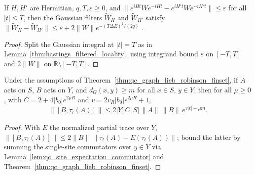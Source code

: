 \begin{lemma}
    \label{thm:hastings_truncated_filter_comparison}
    \leanok
    If $H,H'$ are Hermitian, $q,T,\varepsilon\ge0$, and
    $\|e^{iHt}We^{-iHt}-e^{iH't}We^{-iH't}\|\le\varepsilon$ for all $|t|\le T$,
    then the Gaussian filters $\widetilde W_H$ and $\widetilde W_{H'}$ satisfy
    $\|\widetilde W_H-\widetilde W_{H'}\|\le\varepsilon+2\|W\|e^{-(T\Delta E)^2/(2q)}$
    \cite[eq.~(dmi), lines 1524--1533]{Hastings2006Solving}.
\end{lemma}
\begin{proof}
    \leanok
    Split the Gaussian integral at $|t|=T$ as in
    Lemma~\ref{thm:hastings_filtered_locality}, using integrand bound
    $\varepsilon$ on $[-T,T]$ and $2\|W\|$ on $\mathbb R\setminus[-T,T]$.
\end{proof}

\begin{lemma}
    \label{thm:hastings_truncated_multisite_lieb_robinson}
    \leanok
    Under the assumptions of Theorem~\ref{thm:qc_graph_lieb_robinson_finset}, if
    $A$ acts on $S$, $B$ acts on $Y$, and $d_G(x,y)\ge m$ for all $x\in S$,
    $y\in Y$, then for all $\mu\ge0$, with $C=2+4|b_0|e^{2\mu R}$ and
    $v=2v_R|b_0|e^{2\mu R}+1$,
    \begin{align}
        \|[B,\tau_t(A)]\|\le2|Y|\,C\,|S|\,\|A\|\,\|B\|\,e^{v|t|-\mu m}.
        \label{eq:hastings_truncated_multisite_lieb_robinson}
    \end{align}
\end{lemma}
\begin{proof}
    \leanok
    With $E$ the normalized partial trace over $Y$,
    $\|[B,\tau_t(A)]\|\le2\|B\|\,\|\tau_t(A)-E(\tau_t(A))\|$; bound the latter
    by summing the single-site commutators over $y\in Y$ via
    Lemma~\ref{lem:qc_site_expectation_commutator} and
    Theorem~\ref{thm:qc_graph_lieb_robinson_finset}.
\end{proof}

